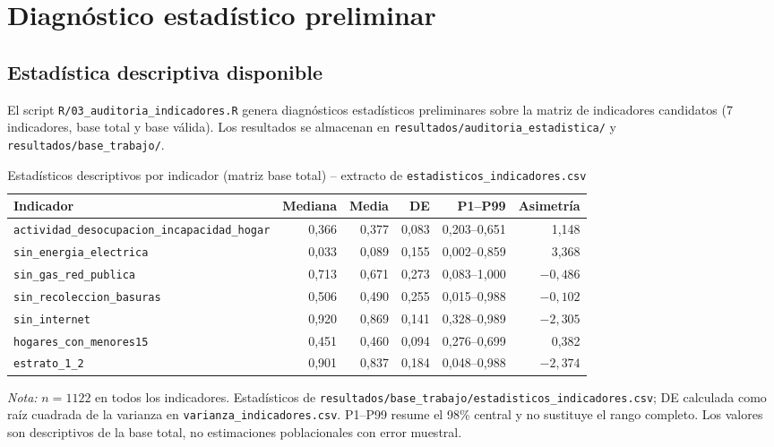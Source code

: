 \section{Diagnóstico estadístico preliminar}
\label{ch:diagnostico}

\subsection{Estadística descriptiva disponible}
\label{sec:estadistica_descriptiva}

El script \texttt{R/03\_auditoria\_indicadores.R} genera diagnósticos estadísticos preliminares sobre la matriz de indicadores candidatos (7 indicadores, base total y base válida). Los resultados se almacenan en \texttt{resultados/auditoria\_estadistica/} y \texttt{resultados/base\_trabajo/}.

\begin{table}[htbp]
\centering
\caption{Estadísticos descriptivos por indicador (matriz base total) -- extracto de \texttt{estadisticos\_indicadores.csv}}
\label{tab:estadisticos_descriptivos}
\begin{adjustbox}{max width=\textwidth}
\begin{tabular}{@{}lrrrrr@{}}
\toprule
\textbf{Indicador} & \textbf{Mediana} & \textbf{Media} & \textbf{DE} & \textbf{P1--P99} & \textbf{Asimetría} \\
\midrule
\texttt{actividad\_desocupacion\_incapacidad\_hogar} & 0,366 & 0,377 & 0,083 & 0,203--0,651 & 1,148 \\
\texttt{sin\_energia\_electrica} & 0,033 & 0,089 & 0,155 & 0,002--0,859 & 3,368 \\
\texttt{sin\_gas\_red\_publica} & 0,713 & 0,671 & 0,273 & 0,083--1,000 & $-0,486$ \\
\texttt{sin\_recoleccion\_basuras} & 0,506 & 0,490 & 0,255 & 0,015--0,988 & $-0,102$ \\
\texttt{sin\_internet} & 0,920 & 0,869 & 0,141 & 0,328--0,989 & $-2,305$ \\
\texttt{hogares\_con\_menores15} & 0,451 & 0,460 & 0,094 & 0,276--0,699 & 0,382 \\
\texttt{estrato\_1\_2} & 0,901 & 0,837 & 0,184 & 0,048--0,988 & $-2,374$ \\
\bottomrule
\end{tabular}
\end{adjustbox}
\end{table}

\noindent \textit{Nota:} $n=1122$ en todos los indicadores. Estadísticos de \texttt{resultados/base\_trabajo/estadisticos\_indicadores.csv}; DE calculada como raíz cuadrada de la varianza en \texttt{varianza\_indicadores.csv}. P1--P99 resume el 98\% central y no sustituye el rango completo. Los valores son descriptivos de la base total, no estimaciones poblacionales con error muestral.

